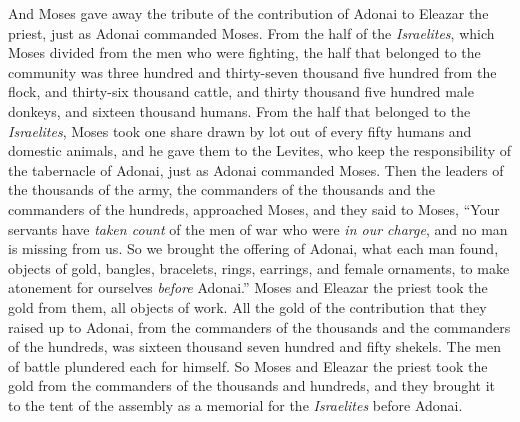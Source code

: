 \begin{biblechapter}
\verse And Moses gave away the tribute of the contribution of Adonai to Eleazar the priest, just as Adonai commanded Moses.
\verse From the half of the \textit{Israelites}, which Moses divided from the men who were fighting,
\verse the half that belonged to the community was three hundred and thirty-seven thousand five hundred from the flock,
\verse and thirty-six thousand cattle,
\verse and thirty thousand five hundred male donkeys,
\verse and sixteen thousand humans.
\verse From the half that belonged to the \textit{Israelites}, Moses took one share drawn by lot out of every fifty humans and domestic animals, and he gave them to the Levites, who keep the responsibility of the tabernacle of Adonai, just as Adonai commanded Moses.
\verse Then the leaders of the thousands of the army, the commanders of the thousands and the commanders of the hundreds, approached Moses,
\verse and they said to Moses, “Your servants have \textit{taken count} of the men of war who were \textit{in our charge}, and no man is missing from us.
\verse So we brought the offering of Adonai, what each man found, objects of gold, bangles, bracelets, rings, earrings, and female ornaments, to make atonement for ourselves \textit{before} Adonai.”
\verse Moses and Eleazar the priest took the gold from them, all objects of work.
\verse All the gold of the contribution that they raised up to Adonai, from the commanders of the thousands and the commanders of the hundreds, was sixteen thousand seven hundred and fifty shekels.
\verse The men of battle plundered each for himself.
\verse So Moses and Eleazar the priest took the gold from the commanders of the thousands and hundreds, and they brought it to the tent of the assembly as a memorial for the \textit{Israelites} before Adonai.
\end{biblechapter}

